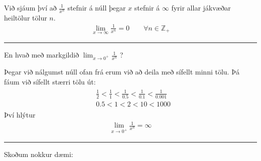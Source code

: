 \documentclass[a4paper,10pt,icelandic]{sphinxmanual}
\begin{document}
Við sjáum því að \(\frac{1}{x^n}\) stefnir á núll þegar \(x\) stefnir á \(\infty\) fyrir allar jákvæðar heiltölur tölur \(n\).
\begin{equation*}
\begin{split}\lim_{x \to \infty} \frac{1}{x^n} = 0 \qquad \forall n \in \mathbb{Z}_+\end{split}
\end{equation*}
\begin{figure}[htbp]
\centering

\noindent{}
\end{figure}


\bigskip\hrule\bigskip


En hvað með markgildið \(\lim_{x\to 0^+} \frac{1}{x^n}\) ?

Þegar við nálgumst núll ofan frá erum við að deila með sífellt minni tölu. Þá fáum við sífellt stærri tölu út:
\begin{equation*}
\begin{split}\begin{aligned}
&\frac{1}{2} <\frac{1}{1}<\frac{1}{0.5} <\frac{1}{0.1} <\frac{1}{0.001}\\
&0.5<1<2<10 < 1000
\end{aligned}\end{split}
\end{equation*}
Því hlýtur
\begin{equation*}
\begin{split}\lim_{x\to 0^+} \frac{1}{x^n} = \infty\end{split}
\end{equation*}

\bigskip\hrule\bigskip


Skoðum nokkur dæmi:
\end{document}
